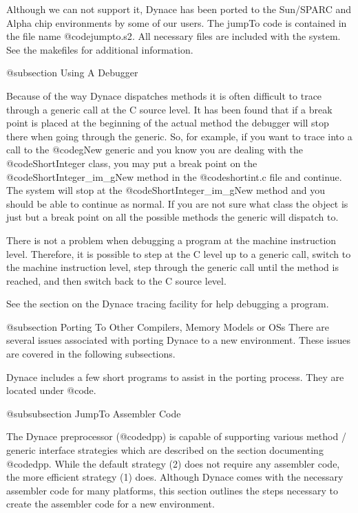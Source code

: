 Although we can not support it, Dynace has been ported to the Sun/SPARC
and Alpha chip environments by some of our users.  The jumpTo code is
contained in the file name @code{jumpto.s2}.  All necessary files are
included with the system.  See the makefiles for additional information.

@subsection Using A Debugger

Because of the way Dynace dispatches methods it is often difficult to
trace through a generic call at the C source level.  It has been found
that if a break point is placed at the beginning of the actual method
the debugger will stop there when going through the generic.  So, for
example, if you want to trace into a call to the @code{gNew} generic and
you know you are dealing with the @code{ShortInteger} class, you may put
a break point on the @code{ShortInteger_im_gNew} method in the
@code{shortint.c} file and continue.  The system will stop at the
@code{ShortInteger_im_gNew} method and you should be able to continue as
normal.  If you are not sure what class the object is just but a break
point on all the possible methods the generic will dispatch to.

There is not a problem when debugging a program at the machine instruction
level.  Therefore, it is possible to step at the C level up to a generic
call, switch to the machine instruction level, step through the generic
call until the method is reached, and then switch back to the C source
level.


See the section on the Dynace tracing facility for help debugging
a program.



@subsection Porting To Other Compilers, Memory Models or OSs
There are several issues associated with porting Dynace to a new
environment.  These issues are covered in the following subsections.

Dynace includes a few short programs to assist in the porting process.
They are located under @code{\DYNACE\KERNEL\PORT}.


@subsubsection JumpTo Assembler Code

The Dynace preprocessor (@code{dpp}) is capable of supporting various
method / generic interface strategies which are described on the section
documenting @code{dpp}.  While the default strategy (2) does not require
any assembler code, the more efficient strategy (1) does.  Although
Dynace comes with the necessary assembler code for many platforms, this
section outlines the steps necessary to create the assembler code for a
new environment.

